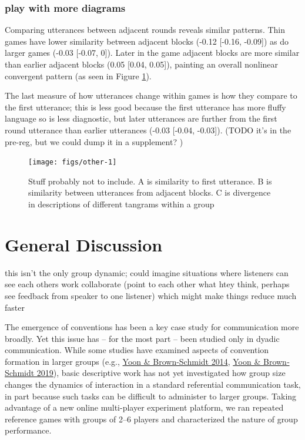 \documentclass[
  english,
  a4paper,
]{article}
\begin{document}
\hypertarget{play-with-more-diagrams}{%
\subsubsection{play with more diagrams}\label{play-with-more-diagrams}}

Comparing utterances between adjacent rounds reveals similar patterns. Thin games have lower similarity between adjacent blocks (-0.12 {[}-0.16, -0.09{]}) as do larger games (-0.03 {[}-0.07, 0{]}). Later in the game adjacent blocks are more similar than earlier adjacent blocks (0.05 {[}0.04, 0.05{]}), painting an overall nonlinear convergent pattern (as seen in Figure \ref{fig:other}).

The last measure of how utterances change within games is how they compare to the first utterance; this is less good because the first utterance has more fluffy language so is less diagnostic, but later utterances are further from the first round utterance than earlier utterances (-0.03 {[}-0.04, -0.03{]}). (TODO it's in the pre-reg, but we could dump it in a supplement? )

\begin{figure}[t!]

{\centering \texttt{[image: figs/other-1]} 

}

\caption{Stuff probably not to include. A is similarity to first utterance. B is similarity between utterances from adjacent blocks. C is divergence in descriptions of different tangrams within a group}\label{fig:other}
\end{figure}

\hypertarget{general-discussion}{%
\section{General Discussion}\label{general-discussion}}

this isn't the only group dynamic; could imagine situations where listeners can see each others work collaborate (point to each other what htey think, perhaps see feedback from speaker to one listener) which might make things reduce much faster

The emergence of conventions has been a key case study for communication more broadly. Yet this issue has -- for the most part -- been studied only in dyadic communication. While some studies have examined aspects of convention formation in larger groups (e.g., \protect\hyperlink{ref-yoonAdjustingConceptualPacts2014}{Yoon \& Brown-Schmidt 2014}, \protect\hyperlink{ref-yoonAudienceDesignMultiparty2019}{Yoon \& Brown‐Schmidt 2019}), basic descriptive work has not yet investigated how group size changes the dynamics of interaction in a standard referential communication task, in part because such tasks can be difficult to administer to larger groups. Taking advantage of a new online multi-player experiment platform, we ran repeated reference games with groups of 2--6 players and characterized the nature of group performance.
\end{document}
